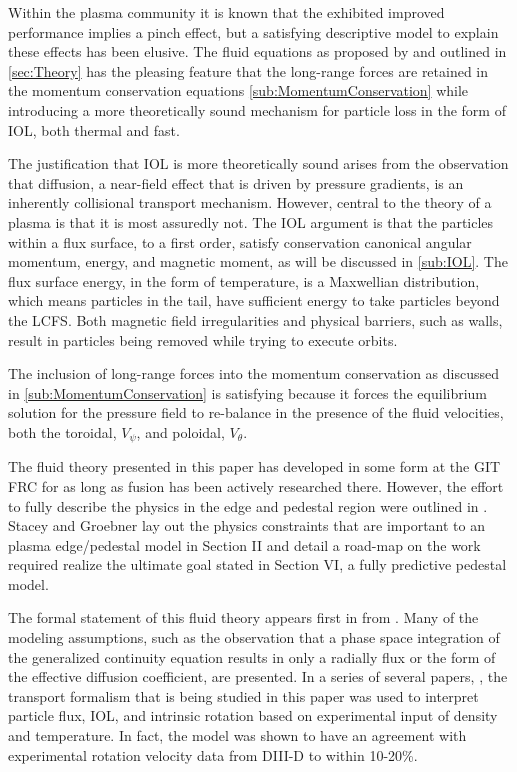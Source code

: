 Within the plasma community it is known that the exhibited improved performance implies a pinch effect, but a satisfying descriptive model to explain these effects has been elusive. The fluid equations as proposed by \citeauthor{Stacey2017} \cite{Stacey2017} and outlined in \cref{sec:Theory} has the pleasing feature that the long-range \vxb forces are retained in the momentum conservation equations \cref{sub:MomentumConservation} while introducing a more theoretically sound mechanism for particle loss in the form of \ac{IOL}, both thermal and fast. 

The justification that \ac{IOL} is more theoretically sound arises from the observation that diffusion, a near-field effect that is driven by pressure gradients, is an inherently collisional transport mechanism. However, central to the theory of a plasma is that it is most assuredly not. The \ac{IOL} argument is that the particles within a flux surface, to a first order, satisfy conservation canonical angular momentum, energy, and magnetic moment, as will be discussed in \cref{sub:IOL}. The flux surface energy, in the form of temperature, is a Maxwellian distribution, which means particles in the tail, have sufficient energy to take particles beyond the \ac{LCFS}. Both magnetic field irregularities and physical barriers, such as walls, result in particles being removed while trying to execute orbits. 

The inclusion of long-range \vxb forces into the momentum conservation as discussed in \cref{sub:MomentumConservation} is satisfying because it forces the equilibrium solution for the pressure field to re-balance in the presence of the fluid velocities, both the toroidal, $V_\psi$, and poloidal, $V_\theta$.

The fluid theory presented in this paper has developed in some form at the \ac{GIT} \ac{FRC} for as long as fusion has been actively researched there. However, the effort to fully describe the physics in the edge and pedestal region were outlined in \cite{Stacey2003}.  Stacey and Groebner lay out the physics constraints that are important to an plasma edge/pedestal model in Section II and detail a road-map on the work required realize the ultimate goal stated in Section VI, a fully predictive pedestal model. 

The formal statement of this fluid theory appears first in  from \citeauthor{Stacey2004}\cite{Stacey2004}. Many of the modeling assumptions, such as the observation that a phase space integration of the generalized continuity equation results in only a radially flux or the form of the effective diffusion coefficient, are presented. In a series of several papers, \cite{Stacey2008, Stacey2012, Floyd2012, Wilks2016}, the transport formalism that is being studied in this paper was used to interpret particle flux, \ac{IOL}, and intrinsic rotation based on experimental input of density and temperature. In fact, the model was shown to have an agreement with experimental rotation velocity data from DIII-D to within 10-20\%\cite{Stacey2012}.

